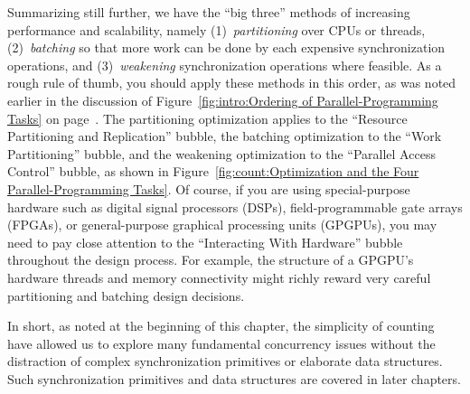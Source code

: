 Summarizing still further, we have the ``big three'' methods of
increasing performance and scalability, namely
(1)~\emph{partitioning} over CPUs or threads,
(2)~\emph{batching} so that more work can be done by each expensive
synchronization operations, and
(3)~\emph{weakening} synchronization operations where feasible.
As a rough rule of thumb, you should apply these methods in this order,
as was noted earlier in the discussion of
Figure~\ref{fig:intro:Ordering of Parallel-Programming Tasks}
on
page~\pageref{fig:intro:Ordering of Parallel-Programming Tasks}.
The partitioning optimization applies to the
``Resource Partitioning and Replication'' bubble,
the batching optimization to the ``Work Partitioning'' bubble,
and the weakening optimization to the ``Parallel Access Control'' bubble,
as shown in
Figure~\ref{fig:count:Optimization and the Four Parallel-Programming Tasks}.
Of course, if you are using special-purpose hardware such as
digital signal processors (DSPs), field-programmable gate arrays (FPGAs),
or general-purpose graphical processing units (GPGPUs), you may need
to pay close attention to the ``Interacting With Hardware'' bubble
throughout the design process.
For example, the structure of a GPGPU's hardware threads and memory
connectivity might richly reward very careful partitioning
and batching design decisions.

In short, as noted at the beginning of this chapter, the simplicity
of counting have allowed us to explore many
fundamental concurrency issues without the distraction of
complex synchronization primitives or elaborate data structures.
Such synchronization primitives and data structures are covered
in later chapters.

